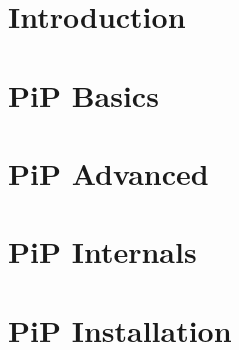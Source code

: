\documentclass[a4paper,11pt,makeidx]{report} %
\begin{document}
\chapter*{Introduction}
\setcounter{page}{1}
\label{sec:intro}

\chapter{PiP Basics}\label{chap:basics}








\chapter{PiP Advanced}\label{chap:advanced}









\chapter{PiP Internals}




\chapter{PiP Installation}








\printindex
\end{document}
